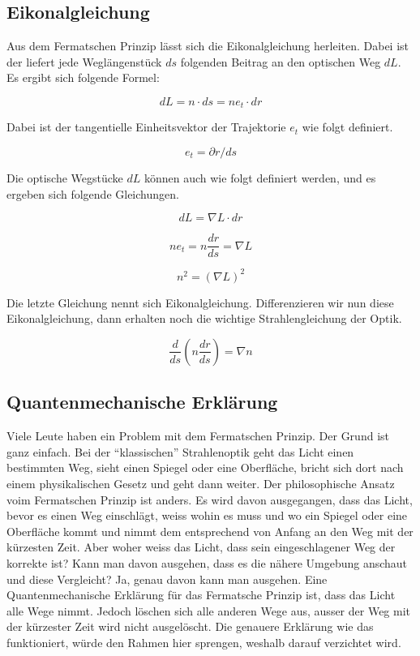 \subsection{Eikonalgleichung}

Aus dem Fermatschen Prinzip lässt sich die Eikonalgleichung herleiten.
Dabei ist der liefert jede Weglängenstück $ds$ folgenden Beitrag an den optischen Weg $dL$. 
Es ergibt sich folgende Formel:

\[
dL = n \cdot ds = n e_t \cdot dr
\]

Dabei ist der tangentielle Einheitsvektor der Trajektorie $e_t$ wie folgt definiert.

\[
e_t = \partial r / ds
\]

Die optische Wegstücke $dL$ können auch wie folgt definiert werden, 
und es ergeben sich folgende Gleichungen.

\[
dL = \nabla L \cdot dr
\]

\[
n e_t = n \frac{dr}{ds} = \nabla L
\]

\[
n^2 = (\nabla L)^2
\]

Die letzte Gleichung nennt sich Eikonalgleichung.
Differenzieren wir nun diese Eikonalgleichung, 
dann erhalten noch die wichtige Strahlengleichung der Optik.

\[
\frac{d}{ds} \left ( n \frac{dr}{ds} \right ) = \nabla n
\]

\subsection{Quantenmechanische Erklärung}
Viele Leute haben ein Problem mit dem Fermatschen Prinzip. 
Der Grund ist ganz einfach. 
Bei der ``klassischen'' Strahlenoptik geht das Licht einen bestimmten Weg, 
sieht einen Spiegel oder eine Oberfläche, bricht sich dort nach einem 
physikalischen Gesetz und geht dann weiter.
Der philosophische Ansatz voim Fermatschen Prinzip ist anders. 
Es wird davon ausgegangen, 
dass das Licht, bevor es einen Weg einschlägt, 
weiss wohin es muss und wo ein Spiegel oder eine Oberfläche kommt und 
nimmt dem entsprechend von Anfang an den Weg mit der kürzesten Zeit.
Aber woher weiss das Licht, dass sein eingeschlagener Weg der korrekte ist?
Kann man davon ausgehen, dass es die nähere Umgebung anschaut und diese Vergleicht?
Ja, genau davon kann man ausgehen. 
Eine Quantenmechanische Erklärung für das Fermatsche Prinzip ist, 
dass das Licht alle Wege nimmt. Jedoch löschen sich alle anderen Wege aus, 
ausser der Weg mit der kürzester Zeit wird nicht ausgelöscht.
Die genauere Erklärung wie das funktioniert, würde den Rahmen hier sprengen, 
weshalb darauf verzichtet wird.